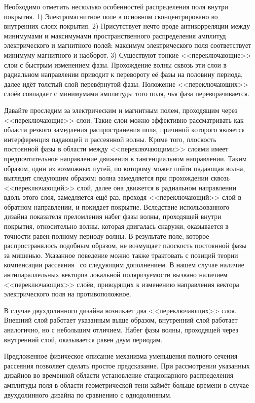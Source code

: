 Необходимо отметить несколько особенностей распределения поля внутри
покрытия. 1) Электромагнитное поле в основном сконцентрировано во
внутренних слоях покрытия. 2) Присутствует нечто вроде антикорреляции
между минимумами и максимумами пространственного распределения
амплитуд электрического и магнитного полей: максимум электрического
поля соответствует минимуму магнитного и наоборот. 3) Существуют
тонкие <<переключающие>> слои с быстрым изменением фазы.  Прохождение
волны сквозь эти слои в радиальном направлении приводит к перевороту
её фазы на половину периода, далее идёт толстый слой перевёрнутой
фазы.  Положение <<переключающих>> слоёв совпадает с минимумами
амплитуды того поля, чья фаза переворачивается.

Давайте проследим за электрическим и магнитным полем, проходящим
через <<переключающие>> слои.  Такие слои можно эффективно
рассматривать как области резкого замедления распространения поля,
причиной которого является интерференция падающей и рассеянной волны.
Кроме того, плоскость постоянной фазы в области между
<<переключающими>> слоями имеет предпочтительное направление движения
в тангенциальном направлении.  Таким образом, один из возможных путей,
по которому может пойти падающая волна, выглядит следующим образом:
волна замедляется при прохождении сквозь <<переключающий>> слой, далее
она движется в радиальном направлении вдоль этого слоя,
замедляется ещё раз, проходя <<переключающий>> слой в обратном
направлении, и покидает покрытие.  Вследствие использованного дизайна
показателя преломления  набег фазы волны, проходящей внутри покрытия,
относительно волны, которая двигалась снаружи, оказывается в точности
равен полному периоду волны.  В результате поле, которое
распространялось подобным образом, не возмущает плоскость постоянной
фазы за мишенью.  Указанное поведение можно также трактовать с позиций
теории компенсации рассеяния~\cite{alu} со следующим дополнением.  В
нашем случае наличие антипараллельных векторов локальной
поляризуемости  вызвано наличием <<переключающих>> слоёв, приводящих к
изменению направления вектора электрического поля на противоположное.

В случае двухдолинного дизайна возникает два <<переключающих>> слоя.
Внешний слой работает указанным выше образом, внутренний слой работает
аналогично, но с небольшим отличием.  Набег фазы волны, проходящей
через внутренний слой, оказывается равен двум периодам.

Предложенное физическое описание механизма уменьшения полного сечения
рассеяния позволяет сделать простое предсказание.  При рассмотрении
указанных дизайнов во временной области установление стационарного
распределения амплитуды поля в области геометрической тени займёт
больше времени в случае двухдолинного дизайна по сравнению с
однодолинным.  

